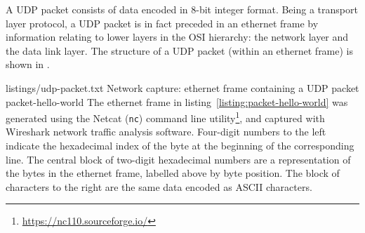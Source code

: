 A UDP packet consists of data encoded in 8-bit integer format.
Being a transport layer protocol, a UDP packet is in fact preceded in an
ethernet frame by information relating to lower layers in the OSI hierarchy: the
network layer and the data link layer.
The structure of a UDP packet (within an ethernet frame) is shown in
.

{listings/udp-packet.txt}
{Network capture: ethernet frame containing a UDP packet}
{packet-hello-world}
\noindent
The ethernet frame in listing~\ref{listing:packet-hello-world} was generated
using the Netcat (\texttt{nc}) command line utility\footnote{
    \url{https://nc110.sourceforge.io/}
}, and captured with Wireshark network traffic analysis software.
Four-digit numbers to the left indicate the hexadecimal index of the byte
at the beginning of the corresponding line.
The central block of two-digit hexadecimal numbers are a representation of the
bytes in the ethernet frame, labelled above by byte position.
The block of characters to the right are the same data encoded as ASCII
characters.

